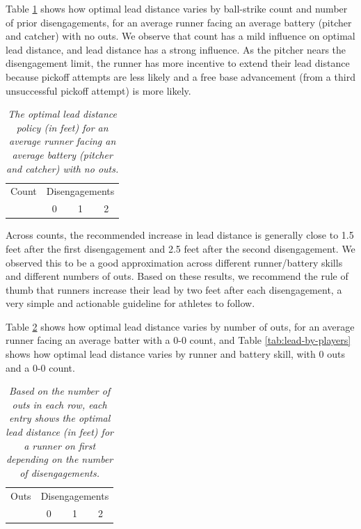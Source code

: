 \documentclass{article}
\begin{document}
      Table \ref{tab:lead-by-count} shows how optimal lead distance varies by ball-strike count and number of prior disengagements, for an average runner facing an average battery (pitcher and catcher) with no outs. We observe that count has a mild influence on optimal lead distance, and lead distance has a strong influence. As the pitcher nears the disengagement limit, the runner has more incentive to extend their lead distance because pickoff attempts are less likely and a free base advancement (from a third unsuccessful pickoff attempt) is more likely.
 
      \begin{table}
        \centering
        \begin{tabular}{c|ccc}
          Count & \multicolumn{3}{c}{Disengagements}\\
                & 0 & 1 & 2\\
          \hline
          
        \end{tabular}
        \caption{
          \it The optimal lead distance policy (in feet) for an average runner facing an average battery (pitcher and catcher) with no outs.
        }
        \label{tab:lead-by-count}
      \end{table}
      
      Across counts, the recommended increase in lead distance is generally close to 1.5 feet after the first disengagement and 2.5 feet after the second disengagement. We observed this to be a good approximation across different runner/battery skills and different numbers of outs. Based on these results, we recommend the rule of thumb that runners increase their lead by two feet after each disengagement, a very simple and actionable guideline for athletes to follow.
    
      Table \ref{tab:lead-by-runners-outs} shows how optimal lead distance varies by number of outs, for an average runner facing an average batter with a 0-0 count, and Table \ref{tab:lead-by-players} shows how optimal lead distance varies by runner and battery skill, with 0 outs and a 0-0 count.

      \begin{table}
        \centering
        \begin{tabular}{c|ccc}
          Outs  & \multicolumn{3}{c}{Disengagements}\\
                & 0 & 1 & 2 \\
          \hline
          
        \end{tabular}
        \caption{
          \it Based on the number of outs in each row, each entry shows the optimal lead distance (in feet) for a runner on first depending on the number of disengagements.
        }
        \label{tab:lead-by-runners-outs}
      \end{table}
\end{document}
